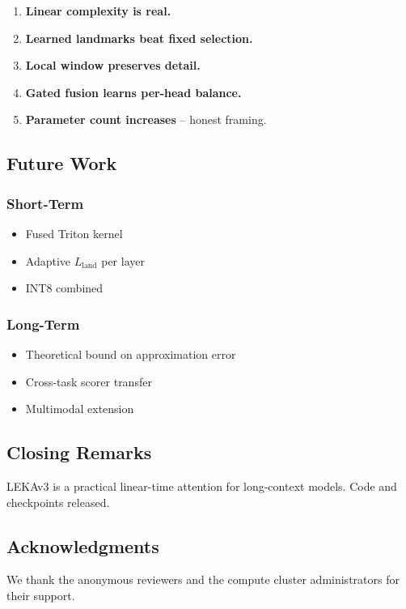\begin{enumerate}
\item \textbf{Linear complexity is real.}
\item \textbf{Learned landmarks beat fixed selection.}
\item \textbf{Local window preserves detail.}
\item \textbf{Gated fusion learns per-head balance.}
\item \textbf{Parameter count increases} -- honest framing.

\end{enumerate}
\subsection{Future Work}

\subsubsection{Short-Term}
\begin{itemize}
\item Fused Triton kernel
\item Adaptive $L_\text{land}$ per layer
\item INT8 combined

\end{itemize}
\subsubsection{Long-Term}
\begin{itemize}
\item Theoretical bound on approximation error
\item Cross-task scorer transfer
\item Multimodal extension

\end{itemize}
\subsection{Closing Remarks}

LEKAv3 is a practical linear-time attention for long-context models. Code 
and checkpoints released.

\subsection{Acknowledgments}

We thank the anonymous reviewers and the compute cluster administrators for their support.

